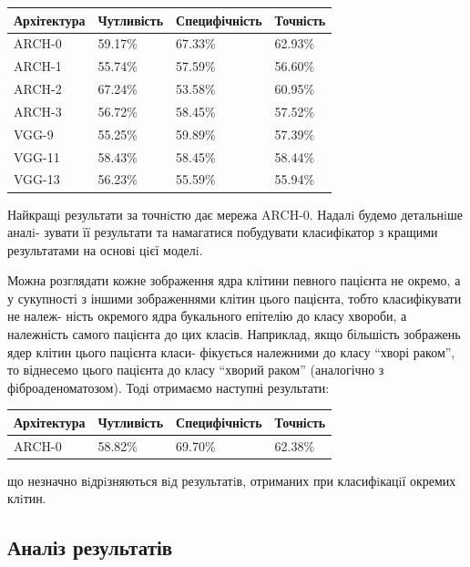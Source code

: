 \bigskip
\begin{center}
\begin{tabular}
{| m{3cm} || m{3cm} | m{3cm} | m{3cm} |}
\hline
Архітектура & Чутливість & Специфічність & Точність \\ \hline \hline
ARCH-0 & 59.17\%  & 67.33\%  & 62.93\%  \\ \hline
ARCH-1 & 55.74\%  & 57.59\%  & 56.60\%  \\ \hline
ARCH-2 & 67.24\%  & 53.58\%  & 60.95\%  \\ \hline
ARCH-3 & 56.72\%  & 58.45\%  & 57.52\%  \\ \hline
VGG-9  & 55.25\%  & 59.89\%  & 57.39\%  \\ \hline
VGG-11 & 58.43\%  & 58.45\%  & 58.44\%  \\ \hline
VGG-13 & 56.23\%  & 55.59\%  & 55.94\%  \\ \hline
\end{tabular}
\end{center}
\bigskip

Найкращi результати за точнiстю дає мережа ARCH-0. Надалi будемо детальнiше аналi- зувати її результати та намагатися побудувати класифiкатор з кращими результатами на основi цiєї моделi.

Можна розглядати кожне зображення ядра клітини певного пацієнта не окремо, а у сукупності з іншими зображеннями клітин цього пацієнта, тобто класифікувати не належ- ність окремого ядра букального епітелію до класу хвороби, а належність самого пацієнта до цих класів. Наприклад, якщо більшість зображень ядер клітин цього пацієнта класи- фікується належними до класу \enquote{хворі раком}, то віднесемо цього пацієнта до класу \enquote{хворий раком} (аналогічно з фіброаденоматозом). Тоді отримаємо наступні результати:


\begin{center}
	\begin{tabular}
		{| m{3cm} || m{3cm} | m{3cm} | m{3cm} |}
		\hline
		Архітектура & Чутливість & Специфічність & Точність \\ \hline \hline
		ARCH-0 & 58.82\%  & 69.70\%  & 62.38\%  \\ \hline
	\end{tabular}
\end{center}

що незначно вiдрiзняються вiд результатiв, отриманих при класифiкацiї окремих клiтин.

\subsection{Аналіз результатів}

